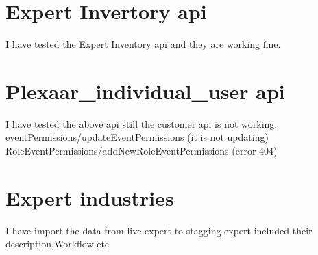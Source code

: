 \documentclass[12pt,a4paper]{article}
\begin{document}
	
 
 \clearpage
\section{ Expert Invertory api}
I have tested the Expert Inventory api and they are working fine.
\section{Plexaar_individual_user api}
I have tested the above api still the customer api is not working.
\newline
eventPermissions/updateEventPermissions (it is not updating)
\newline
RoleEventPermissions/addNewRoleEventPermissions (error 404)
\section{Expert industries}
I have import the data from live expert to stagging expert included their description,Workflow etc
\end{document}
